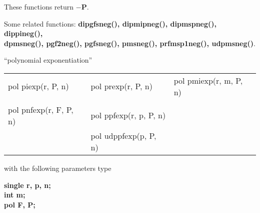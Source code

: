 These functions return {\bf $-$P}.

Some related functions:\hspace*{0.7em}
{\bf  dipgfsneg(), dipmipneg(), dipmspneg(), dippineg(), \\
dpmsneg(), pgf2neg(), pgfsneg(), pmsneg(), prfmsp1neg(), udpmsneg()}.


%
%
 
\begin{center} ``polynomial exponentiation'' \end{center}
\begin{center}
{\bf
\begin{tabular}{lll}
pol piexp(r, P, n)   & pol prexp(r, P, n) & pol pmiexp(r, m, P, n)\\
&&\\
pol pnfexp(r, F, P, n) & pol ppfexp(r, p, P, n) &\\
                       & pol udppfexp(p, P, n)  &\\
\end{tabular} }
\end{center}
\parbox[t]{2.5in}{with the following parameters type}
\parbox[t]{3.0in}{\bf single r, p, n;\\
                      int m;\\
                      pol F, P;}


